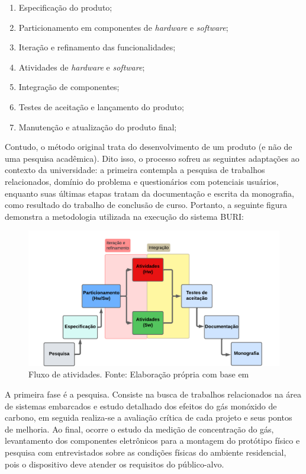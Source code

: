 \begin{enumerate}
    \item Especificação do produto;
    \item Particionamento em componentes de \textit{hardware} e \textit{software};
    \item Iteração e refinamento das funcionalidades;
    \item Atividades de \textit{hardware} e \textit{software};
    \item Integração de componentes;
    \item Testes de aceitação e lançamento do produto;
    \item Manutenção e atualização do produto final;
\end{enumerate}

Contudo, o método original trata do desenvolvimento de um produto (e não de uma pesquisa acadêmica). Dito isso, o processo sofreu as seguintes 
adaptações ao contexto da universidade: a primeira contempla a pesquisa de trabalhos relacionados, domínio do problema e questionários com potenciais usuários, enquanto suas últimas etapas tratam da documentação e escrita 
da monografia, como resultado do trabalho de conclusão de curso. Portanto, a seguinte figura demonstra a metodologia utilizada na execução do sistema BURI: 

\begin{figure}[ht]
\centering
\includegraphics[width=.82\textwidth]{img/diagrama-metodologia.png}
\caption{Fluxo de atividades. Fonte: Elaboração própria com base  em \cite{system-design-IOT}}\label{figMetodologia}
\end{figure}

A primeira fase é a pesquisa. Consiste na busca de trabalhos relacionados na área de sistemas embarcados 
e estudo detalhado dos efeitos do gás monóxido de carbono, em seguida realiza-se a avaliação crítica de cada projeto 
e seus pontos de melhoria. Ao final, ocorre o estudo da medição de concentração do gás, levantamento dos componentes 
eletrônicos para a montagem do protótipo físico e pesquisa com entrevistados sobre as condições físicas do ambiente residencial, pois o
dispositivo deve atender os requisitos do público-alvo.

